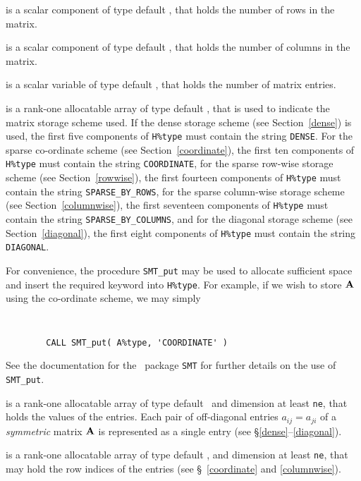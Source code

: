 \documentclass{galahad}
\begin{document}
\begin{description}

 is a scalar component of type default \integer,
that holds the number of rows in the matrix.

 is a scalar component of type default \integer,
that holds the number of columns in the matrix.

 is a scalar variable of type default \integer, that
holds the number of matrix entries.

 is a rank-one allocatable array of type default \character, that
is used to indicate the matrix storage scheme used.  If the dense storage scheme
(see Section~\ref{dense}) is used,
the first five components of {\tt H\%type} must contain the
string {\tt DENSE}.
For the sparse co-ordinate scheme (see Section~\ref{coordinate}),
the first ten components of {\tt H\%type} must contain the
string {\tt COORDINATE},
for the sparse row-wise storage scheme (see Section~\ref{rowwise}),
the first fourteen components of {\tt H\%type} must contain the
string {\tt SPARSE\_BY\_ROWS},
for the sparse column-wise storage scheme (see Section~\ref{columnwise}),
the first seventeen components of {\tt H\%type} must contain the
string {\tt SPARSE\_BY\_COLUMNS},
and for the diagonal storage scheme (see Section~\ref{diagonal}),
the first eight components of {\tt H\%type} must contain the
string {\tt DIAGONAL}.

For convenience, the procedure {\tt SMT\_put}
may be used to allocate sufficient space and insert the required keyword
into {\tt H\%type}.
For example, if we wish to store ${\mathbf{A}}$ using the co-ordinate scheme,
we may simply
{\tt
\begin{verbatim}
        CALL SMT_put( A%type, 'COORDINATE' )
\end{verbatim}
}
\noindent
See the documentation for the \galahad\ package {\tt SMT}
for further details on the use of {\tt SMT\_put}.

 is a rank-one allocatable array of type default \realdp\,
and dimension at least {\tt ne}, that holds the values of the entries.
Each pair of off-diagonal entries $a_{ij} = a_{ji}$ of a {\em symmetric}
matrix ${\mathbf{A}}$ is represented as a single entry
(see \S\ref{dense}--\ref{diagonal}).

 is a rank-one allocatable array of type default \integer,
and dimension at least {\tt ne}, that may hold the row indices of the entries
(see \S~\ref{coordinate} and \ref{columnwise}).


\end{description}
\end{document}
